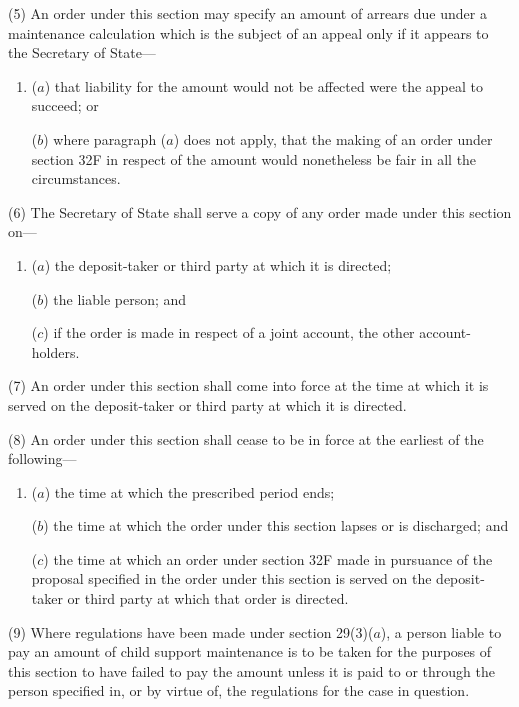\documentclass[12pt,a4paper]{article}
\begin{document}
(5) An order under this section may specify an amount of arrears due under a maintenance calculation which is the subject of an appeal only if it appears to the Secretary of State---
\begin{enumerate}\item[]
($a$) that liability for the amount would not be affected were the appeal to succeed; or

($b$) where paragraph ($a$) does not apply, that the making of an order under section 32F in respect of the amount would nonetheless be fair in all the circumstances.
\end{enumerate}

(6) The Secretary of State shall serve a copy of any order made under this section on---
\begin{enumerate}\item[]
($a$)
the deposit-taker or third party at which it is directed;

($b$)
the liable person; and

($c$)
if the order is made in respect of a joint account, the other account-holders.
\end{enumerate}

(7) An order under this section shall come into force at the time at which it is served on the deposit-taker or third party at which it is directed.

(8) An order under this section shall cease to be in force at the earliest of the following---
\begin{enumerate}\item[]
($a$)
the time at which the prescribed period ends;

($b$)
the time at which the order under this section lapses or is discharged; and

($c$)
the time at which an order under section 32F made in pursuance of the proposal specified in the order under this section is served on the deposit-taker or third party at which that order is directed.
\end{enumerate}

(9) Where regulations have been made under section 29(3)($a$), a person liable to pay an amount of child support maintenance is to be taken for the purposes of this section to have failed to pay the amount unless it is paid to or through the person specified in, or by virtue of, the regulations for the case in question.


\end{document}
